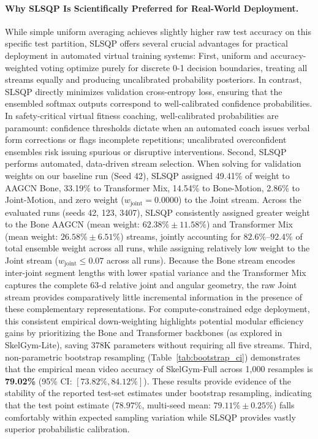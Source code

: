 \documentclass[runningheads]{llncs}
\begin{document}
\paragraph{Why SLSQP Is Scientifically Preferred for Real-World Deployment.} While simple uniform averaging achieves slightly higher raw test accuracy on this specific test partition, SLSQP offers several crucial advantages for practical deployment in automated virtual training systems:
First, uniform and accuracy-weighted voting optimize purely for discrete 0-1 decision boundaries, treating all streams equally and producing uncalibrated probability posteriors. In contrast, SLSQP directly minimizes validation cross-entropy loss, ensuring that the ensembled softmax outputs correspond to well-calibrated confidence probabilities. In safety-critical virtual fitness coaching, well-calibrated probabilities are paramount: confidence thresholds dictate when an automated coach issues verbal form corrections or flags incomplete repetitions; uncalibrated overconfident ensembles risk issuing spurious or disruptive interventions.
Second, SLSQP performs automated, data-driven stream selection. When solving for validation weights on our baseline run (Seed 42), SLSQP assigned 49.41\% of weight to AAGCN Bone, 33.19\% to Transformer Mix, 14.54\% to Bone-Motion, 2.86\% to Joint-Motion, and zero weight ($w_{\text{joint}} = 0.0000$) to the Joint stream. Across the evaluated runs (seeds 42, 123, 3407), SLSQP consistently assigned greater weight to the Bone AAGCN (mean weight: $62.38\% \pm 11.58\%$) and Transformer Mix (mean weight: $26.58\% \pm 6.51\%$) streams, jointly accounting for $82.6\%\text{--}92.4\%$ of total ensemble weight across all runs, while assigning relatively low weight to the Joint stream ($w_{\text{joint}} \le 0.07$ across all runs). Because the Bone stream encodes inter-joint segment lengths with lower spatial variance and the Transformer Mix captures the complete 63-d relative joint and angular geometry, the raw Joint stream provides comparatively little incremental information in the presence of these complementary representations. For compute-constrained edge deployment, this consistent empirical down-weighting highlights potential modular efficiency gains by prioritizing the Bone and Transformer backbones (as explored in SkelGym-Lite), saving 378K parameters without requiring all five streams.
Third, non-parametric bootstrap resampling (Table~\ref{tab:bootstrap_ci}) demonstrates that the empirical mean video accuracy of SkelGym-Full across 1,000 resamples is \textbf{79.02\%} (95\% CI: $[73.82\%, 84.12\%]$). These results provide evidence of the stability of the reported test-set estimates under bootstrap resampling, indicating that the test point estimate ($78.97\%$, multi-seed mean: $79.11\% \pm 0.25\%$) falls comfortably within expected sampling variation while SLSQP provides vastly superior probabilistic calibration.
\end{document}
